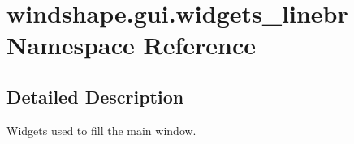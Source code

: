 \hypertarget{namespacewindshape_1_1gui_1_1widgets__linebr}{}\section{windshape.\+gui.\+widgets\+\_\+linebr Namespace Reference}
\label{namespacewindshape_1_1gui_1_1widgets__linebr}


\subsection{Detailed Description}
\begin{DoxyVerb}Widgets used to fill the main window.
\end{DoxyVerb}
 